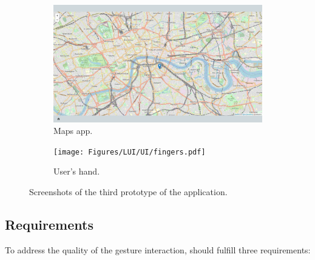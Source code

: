 \begin{figure}[p]
    \begin{subfigure}{.47\textwidth}
        \centering
        \includegraphics[width=.96\linewidth]{Figures/LUI/UI/maps.pdf} 
        \vspace{-5pt}
        \captionsetup{width=.9\linewidth}
        \caption{Maps app.}
        \label{fig:lui:screenshots:maps}
    \end{subfigure}
    \begin{subfigure}{.47\textwidth}
        \centering
        \texttt{[image: Figures/LUI/UI/fingers.pdf]} 
        \vspace{-5pt}
        \captionsetup{width=.9\linewidth}
        \caption{User's hand.}
        \label{fig:lui:screenshots:hand}
    \end{subfigure}
    
    \vspace{-4pt}
    \caption{Screenshots of the third prototype of the \lui application.}
    \label{fig:lui:screenshots}
\end{figure}

\subsection{Requirements} \label{sec:lui:description:requirements}
To address the quality of the gesture interaction, \lui should fulfill three requirements:

